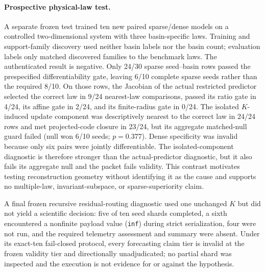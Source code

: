 \paragraph{Prospective physical-law test.}
A separate frozen test trained ten new paired sparse/dense models on a
controlled two-dimensional system with three basin-specific laws. Training
and support-family discovery used neither basin labels nor the basin count;
evaluation labels only matched discovered families to the benchmark laws.
The authenticated result is negative. Only 24/30 sparse seed--basin rows
passed the prespecified differentiability gate, leaving 6/10 complete sparse
seeds rather than the required 8/10. On those rows, the Jacobian of the actual
restricted predictor selected the correct law in 9/24 nearest-law comparisons,
passed its ratio gate in 4/24, its affine gate in 2/24, and its finite-radius
gate in 0/24. The isolated $K$-induced update component was descriptively
nearest to the correct law in 24/24 rows and met projected-code closure in
23/24, but its aggregate matched-null guard failed (null won 6/10 seeds;
$p=0.377$). Dense specificity was invalid because only six pairs were jointly
differentiable. The isolated-component diagnostic is therefore stronger than
the actual-predictor diagnostic, but it also fails its aggregate null and the
packet fails validity. This contrast motivates testing reconstruction geometry
without identifying it as the cause and supports no multiple-law,
invariant-subspace, or sparse-superiority claim.

A final frozen recursive residual-routing diagnostic used one unchanged $K$
but did not yield a scientific decision: five of ten seed shards completed, a
sixth encountered a nonfinite payload value (\texttt{inf}) during strict serialization, four were
not run, and the required telemetry assessment and summary were absent. Under
its exact-ten fail-closed protocol, every forecasting claim tier is
invalid at the frozen validity tier and directionally unadjudicated; no partial
shard was inspected and the execution is not evidence for or against the hypothesis.
